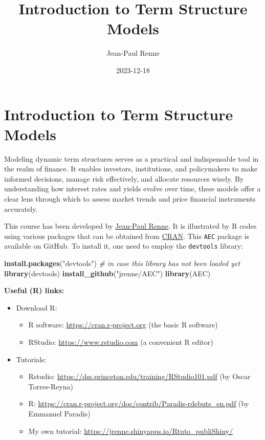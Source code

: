\documentclass[
  12pt,
]{book}
\title{Introduction to Term Structure Models}
\author{Jean-Paul Renne}
\date{2023-12-18}
\newenvironment{Shaded}{\begin{snugshade}}{\end{snugshade}}
\newcommand{\CommentTok}[1]{\textcolor[rgb]{0.56,0.35,0.01}{\textit{#1}}}
\newcommand{\FunctionTok}[1]{\textcolor[rgb]{0.13,0.29,0.53}{\textbf{#1}}}
\newcommand{\NormalTok}[1]{#1}
\newcommand{\StringTok}[1]{\textcolor[rgb]{0.31,0.60,0.02}{#1}}
\providecommand{\tightlist}{%
  \setlength{\itemsep}{0pt}\setlength{\parskip}{0pt}}
\theoremstyle{definition}
\theoremstyle{definition}
\theoremstyle{definition}
\theoremstyle{definition}
\theoremstyle{remark}
\begin{document}
\maketitle

{
\setcounter{tocdepth}{1}
\tableofcontents
}
\newcommand{\bv}[1]{\mathbf{#1}}

\hypertarget{intro}{%
\chapter*{Introduction to Term Structure Models}\label{intro}}

Modeling dynamic term structures serves as a practical and indispensable tool in the realm of finance. It enables investors, institutions, and policymakers to make informed decisions, manage risk effectively, and allocate resources wisely. By understanding how interest rates and yields evolve over time, these models offer a clear lens through which to assess market trends and price financial instruments accurately.

This course has been developed by \href{https://sites.google.com/site/jeanpaulrenne/home}{Jean-Paul Renne}. It is illustrated by R codes using various packages that can be obtained from \href{https://cran.r-project.org}{CRAN}. This \texttt{AEC} package is available on GitHub. To install it, one need to employ the \texttt{devtools} library:

\begin{Shaded}
\begin{Highlighting}[]
\FunctionTok{install.packages}\NormalTok{(}\StringTok{"devtools"}\NormalTok{) }\CommentTok{\# in case this library has not been loaded yet}
\FunctionTok{library}\NormalTok{(devtools)}
\FunctionTok{install\_github}\NormalTok{(}\StringTok{"jrenne/AEC"}\NormalTok{)}
\FunctionTok{library}\NormalTok{(AEC)}
\end{Highlighting}
\end{Shaded}

\textbf{Useful (R) links:}

\begin{itemize}
\item
  Download R:

  \begin{itemize}
  \tightlist
  \item
    R software: \url{https://cran.r-project.org} (the basic R software)
  \item
    RStudio: \url{https://www.rstudio.com} (a convenient R editor)
  \end{itemize}
\item
  Tutorials:

  \begin{itemize}
  \tightlist
  \item
    Rstudio: \url{https://dss.princeton.edu/training/RStudio101.pdf} (by Oscar Torres-Reyna)
  \item
    R: \url{https://cran.r-project.org/doc/contrib/Paradis-rdebuts_en.pdf} (by Emmanuel Paradis)
  \item
    My own tutorial: \url{https://jrenne.shinyapps.io/Rtuto_publiShiny/}
  \end{itemize}
\end{itemize}
\end{document}
